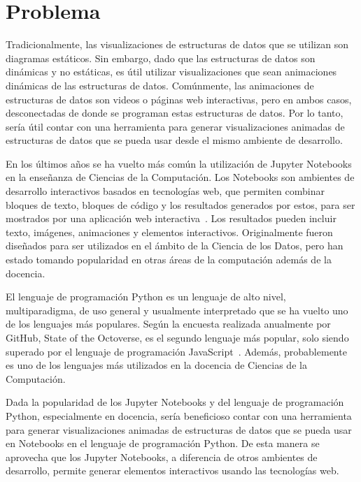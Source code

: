 \chapter{Problema}

Tradicionalmente, las visualizaciones de estructuras de datos que se utilizan son diagramas estáticos. Sin embargo, dado que las estructuras de datos son dinámicas y no estáticas, es útil utilizar visualizaciones que sean animaciones dinámicas de las estructuras de datos. Comúnmente, las animaciones de estructuras de datos son videos o páginas web interactivas, pero en ambos casos, desconectadas de donde se programan estas estructuras de datos. Por lo tanto, sería útil contar con una herramienta para generar visualizaciones animadas de estructuras de datos que se pueda usar desde el mismo ambiente de desarrollo.

En los últimos años se ha vuelto más común la utilización de Jupyter Notebooks en la enseñanza de Ciencias de la Computación. Los Notebooks son ambientes de desarrollo interactivos basados en tecnologías web, que permiten combinar bloques de texto, bloques de código y los resultados generados por estos, para ser mostrados por una aplicación web interactiva~\cite{kluyver2016jupyter}. Los resultados pueden incluir texto, imágenes, animaciones y elementos interactivos. Originalmente fueron diseñados para ser utilizados en el ámbito de la Ciencia de los Datos, pero han estado tomando popularidad en otras áreas de la computación además de la docencia.

El lenguaje de programación Python es un lenguaje de alto nivel, multiparadigma, de uso general y usualmente interpretado que se ha vuelto uno de los lenguajes más populares. Según la encuesta realizada anualmente por GitHub, State of the Octoverse, es el segundo lenguaje más popular, solo siendo superado por el lenguaje de programación JavaScript~\cite{encuesta-github}. Además, probablemente es uno de los lenguajes más utilizados en la docencia de Ciencias de la Computación.

Dada la popularidad de los Jupyter Notebooks y del lenguaje de programación Python, especialmente en docencia, sería beneficioso contar con una herramienta para generar visualizaciones animadas de estructuras de datos que se pueda usar en Notebooks en el lenguaje de programación Python. De esta manera se aprovecha que los Jupyter Notebooks, a diferencia de otros ambientes de desarrollo, permite generar elementos interactivos usando las tecnologías web.


